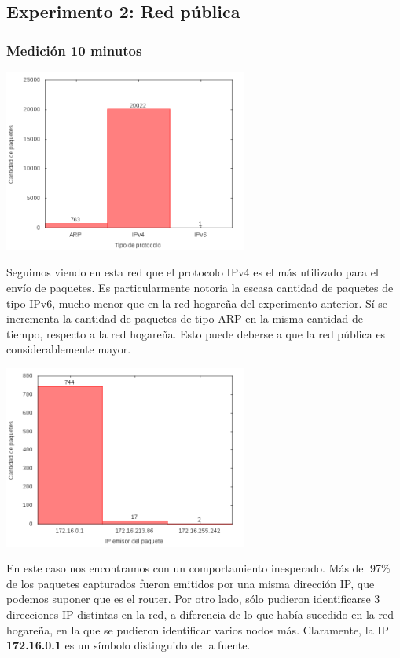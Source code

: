 \subsection{Experimento 2: Red pública}
\subsubsection{Medición 10 minutos}

\begin{center}
\includegraphics[width=8cm]{../mediciones/altop-wifi-10/altop10Protocolos.png}
\end{center}

Seguimos viendo en esta red que el protocolo IPv4 es el más utilizado para el envío de paquetes. Es particularmente notoria la escasa
cantidad de paquetes de tipo IPv6, mucho menor que en la red hogareña del experimento anterior. Sí se incrementa la cantidad de paquetes
de tipo ARP en la misma cantidad de tiempo, respecto a la red hogareña. Esto puede deberse a que la red pública es considerablemente mayor.

\begin{center}
\includegraphics[width=8cm]{../mediciones/altop-wifi-10/altop10IpsSrcArp.png}
\end{center}

En este caso nos encontramos con un comportamiento inesperado. Más del 97\% de los paquetes capturados fueron emitidos por una misma dirección
IP, que podemos suponer que es el router. Por otro lado, sólo pudieron identificarse 3 direcciones IP distintas en la red, a diferencia de lo
que había sucedido en la red hogareña, en la que se pudieron identificar varios nodos más. Claramente, la IP \textbf{172.16.0.1} es un símbolo
distinguido de la fuente.

